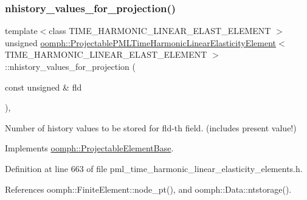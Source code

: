 \subsubsection{\texorpdfstring{nhistory\+\_\+values\+\_\+for\+\_\+projection()}{nhistory\_values\_for\_projection()}}
{\footnotesize\ttfamily template$<$class T\+I\+M\+E\+\_\+\+H\+A\+R\+M\+O\+N\+I\+C\+\_\+\+L\+I\+N\+E\+A\+R\+\_\+\+E\+L\+A\+S\+T\+\_\+\+E\+L\+E\+M\+E\+NT $>$ \\
unsigned \hyperlink{classoomph_1_1ProjectablePMLTimeHarmonicLinearElasticityElement}{oomph\+::\+Projectable\+P\+M\+L\+Time\+Harmonic\+Linear\+Elasticity\+Element}$<$ T\+I\+M\+E\+\_\+\+H\+A\+R\+M\+O\+N\+I\+C\+\_\+\+L\+I\+N\+E\+A\+R\+\_\+\+E\+L\+A\+S\+T\+\_\+\+E\+L\+E\+M\+E\+NT $>$\+::nhistory\+\_\+values\+\_\+for\+\_\+projection (\begin{DoxyParamCaption}\item[{const unsigned \&}]{fld }\end{DoxyParamCaption})\hspace{0.3cm}{\ttfamily [inline]}, {\ttfamily [virtual]}}



Number of history values to be stored for fld-\/th field. (includes present value!) 



Implements \hyperlink{classoomph_1_1ProjectableElementBase_ac6790f394630b964663281f8740f43a5}{oomph\+::\+Projectable\+Element\+Base}.



Definition at line 663 of file pml\+\_\+time\+\_\+harmonic\+\_\+linear\+\_\+elasticity\+\_\+elements.\+h.



References oomph\+::\+Finite\+Element\+::node\+\_\+pt(), and oomph\+::\+Data\+::ntstorage().

\mbox{\label{classoomph_1_1ProjectablePMLTimeHarmonicLinearElasticityElement_a28dec9ac70ed3906c3fe8d2b3ecdec25}} 
